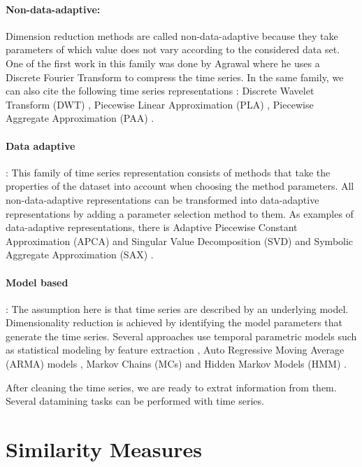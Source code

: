 \paragraph{Non-data-adaptive:}Dimension reduction methods are called non-data-adaptive because they take parameters of which value does not vary according to the considered data set. One of the first work in this family was done by Agrawal \cite{Agrawal1993} where he uses a Discrete Fourier Transform to compress the time series. In the same family, we can also cite the following time series representations :  Discrete Wavelet Transform (DWT) \cite{chan1999efficient}, Piecewise Linear Approximation (PLA) \cite{eriksson2004piecewise}, Piecewise Aggregate Approximation (PAA) \cite{Keogh2001a}. 

\paragraph{Data adaptive}: This family of time series representation  consists of methods that take the properties of the dataset into account when choosing the method parameters. All non-data-adaptive representations can be transformed into data-adaptive representations by adding a parameter selection method to them. As examples of data-adaptive representations, there is Adaptive Piecewise Constant Approximation (APCA) \cite{keogh2001locally} and Singular Value Decomposition (SVD) \cite{de1994singular} and Symbolic Aggregate Approximation (SAX) \cite{lin2003symbolic}.

\paragraph{Model based}: The assumption here is that time series are described by an underlying model.  Dimensionality reduction is achieved by identifying the model parameters that generate the time series. Several approaches use temporal parametric models such as statistical modeling by feature extraction \cite{Esling2012}, Auto Regressive Moving Average (ARMA) models \cite{kalpakis2001distance}, Markov Chains (MCs) and Hidden Markov Models (HMM) \cite{panuccio2002hidden}.


After cleaning the time series, we are ready to extrat information from them. Several datamining tasks can be performed with time series.

\section{Similarity Measures}

